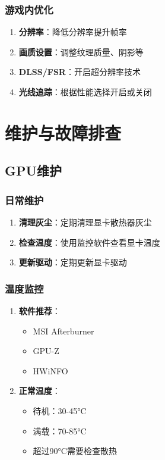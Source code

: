 \documentclass[12pt,UTF8]{ctexbook}
\begin{document}
\section{游戏内优化}

\begin{enumerate}
    \item \textbf{分辨率}：降低分辨率提升帧率
    \item \textbf{画质设置}：调整纹理质量、阴影等
    \item \textbf{DLSS/FSR}：开启超分辨率技术
    \item \textbf{光线追踪}：根据性能选择开启或关闭
\end{enumerate}

\part{维护与故障排查}

\chapter{GPU维护}

\section{日常维护}

\begin{enumerate}
    \item \textbf{清理灰尘}：定期清理显卡散热器灰尘
    \item \textbf{检查温度}：使用监控软件查看显卡温度
    \item \textbf{更新驱动}：定期更新显卡驱动
\end{enumerate}

\section{温度监控}

\begin{enumerate}
    \item \textbf{软件推荐}：
    \begin{itemize}[leftmargin=2em]
        \item MSI Afterburner
        \item GPU-Z
        \item HWiNFO
    \end{itemize}
    
    \item \textbf{正常温度}：
    \begin{itemize}[leftmargin=2em]
        \item 待机：30-45°C
        \item 满载：70-85°C
        \item 超过90°C需要检查散热
    \end{itemize}
\end{enumerate}
\end{document}
